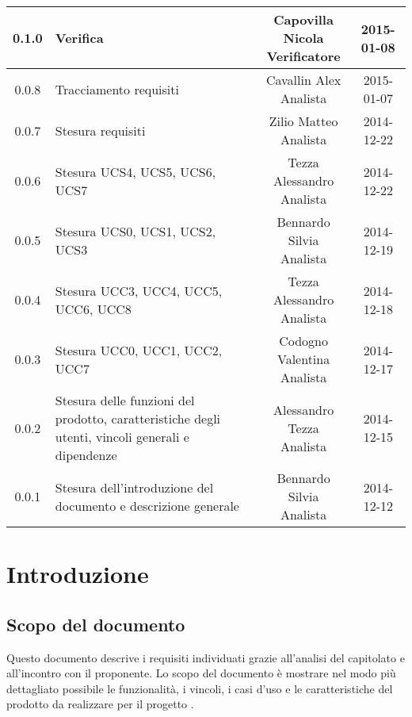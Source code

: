 \begin{center}
\begin{tabularx}{\textwidth}{cXcc}
0.1.0 & Verifica & \multicell{Capovilla Nicola \\ Verificatore} & 2015-01-08 \\\midrule
0.0.8 & Tracciamento requisiti & \multicell{Cavallin Alex \\ Analista} & 2015-01-07 \\\midrule
0.0.7 & Stesura requisiti & \multicell{Zilio Matteo \\ Analista} & 2014-12-22 \\\midrule
0.0.6 & Stesura UCS4, UCS5, UCS6, UCS7 & \multicell{Tezza Alessandro \\ Analista} & 2014-12-22 \\\midrule
0.0.5 & Stesura UCS0, UCS1, UCS2, UCS3 & \multicell{Bennardo Silvia \\ Analista} & 2014-12-19 \\\midrule
0.0.4 & Stesura UCC3, UCC4, UCC5, UCC6, UCC8 & \multicell{Tezza Alessandro \\ Analista} & 2014-12-18 \\\midrule
0.0.3 & Stesura UCC0, UCC1, UCC2, UCC7 & \multicell{Codogno Valentina \\ Analista} & 2014-12-17 \\\midrule
0.0.2 & Stesura delle funzioni del prodotto, caratteristiche degli utenti, vincoli generali e dipendenze & \multicell{Alessandro Tezza \\ Analista} & 2014-12-15 \\\midrule
0.0.1 & Stesura dell'introduzione del documento e descrizione generale & \multicell{Bennardo Silvia \\ Analista} & 2014-12-12 \\



\bottomrule
\end{tabularx}
\end{center}
\newpage



\section{Introduzione}
\subsection{Scopo del documento}
Questo documento descrive i requisiti individuati grazie all'analisi del capitolato e all'incontro con il proponente. Lo scopo del documento è mostrare nel modo più dettagliato possibile le funzionalità, i vincoli, i casi d'uso e le caratteristiche del prodotto da realizzare per il progetto \CAPITOLATO{}.

